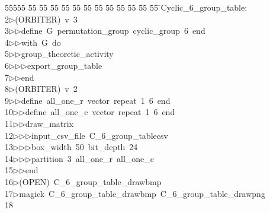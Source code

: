 %
%
\begin{tabbing}
55555 \= 55 \= 55 \= 55 \= 55 \= 55 \= 55 \= 55 \= 55 \= 55 \= 55 \= 55 \= 55 \= \>Cyclic\_6\_group\_table:\\[0pt]
2\>$\triangleright$\>(ORBITER)\ v\ 3\ \\[0pt]
3\>$\triangleright$\>$\triangleright$\>define\ G\ permutation\_group\ cyclic\_group\ 6\ end\ \\[0pt]
4\>$\triangleright$\>$\triangleright$\>with\ G\ do\ \\[0pt]
5\>$\triangleright$\>$\triangleright$\>group\_theoretic\_activity\ \\[0pt]
6\>$\triangleright$\>$\triangleright$\>$\triangleright$\>export\_group\_table\ \\[0pt]
7\>$\triangleright$\>$\triangleright$\>end\\[0pt]
8\>$\triangleright$\>(ORBITER)\ v\ 2\ \\[0pt]
9\>$\triangleright$\>$\triangleright$\>define\ all\_one\_r\ vector\ repeat\ 1\ 6\ end\ \\[0pt]
10\>$\triangleright$\>$\triangleright$\>define\ all\_one\_c\ vector\ repeat\ 1\ 6\ end\ \\[0pt]
11\>$\triangleright$\>$\triangleright$\>draw\_matrix\ \\[0pt]
12\>$\triangleright$\>$\triangleright$\>$\triangleright$\>input\_csv\_file\ C\_6\_group\_tablecsv\ \\[0pt]
13\>$\triangleright$\>$\triangleright$\>$\triangleright$\>box\_width\ 50\ bit\_depth\ 24\ \\[0pt]
14\>$\triangleright$\>$\triangleright$\>$\triangleright$\>partition\ 3\ all\_one\_r\ all\_one\_c\ \\[0pt]
15\>$\triangleright$\>$\triangleright$\>end\\[0pt]
16\>$\triangleright$\>(OPEN)\ C\_6\_group\_table\_drawbmp\\[0pt]
17\>$\triangleright$\>magick\ C\_6\_group\_table\_drawbmp\ C\_6\_group\_table\_drawpng\\[0pt]
18\>\end{tabbing}
